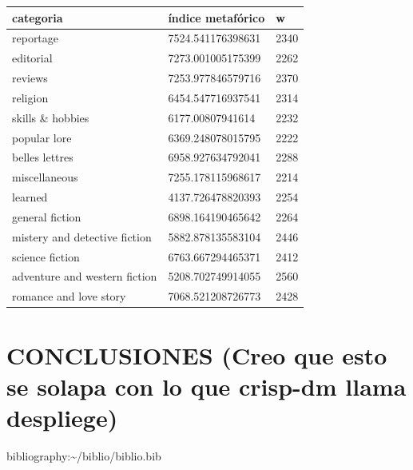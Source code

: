 \documentclass[twoside]{article}
\begin{document}
   \begin{table}[!ht]
    \centering
    \begin{tabular}{|l|l|l|}
    \hline
        categoria & índice metafórico & w \\ \hline
        reportage & 7524.541176398631 & 2340 \\ \hline
        editorial & 7273.001005175399 & 2262 \\ \hline
        reviews & 7253.977846579716 & 2370 \\ \hline
        religion & 6454.547716937541 & 2314 \\ \hline
        skills \& hobbies & 6177.00807941614 & 2232 \\ \hline
        popular lore & 6369.248078015795 & 2222 \\ \hline
        belles lettres & 6958.927634792041 & 2288 \\ \hline
        miscellaneous & 7255.178115968617 & 2214 \\ \hline
        learned & 4137.726478820393 & 2254 \\ \hline
        general fiction & 6898.164190465642 & 2264 \\ \hline
        mistery and detective fiction & 5882.878135583104 & 2446 \\ \hline
        science fiction & 6763.667294465371 & 2412 \\ \hline
        adventure and western fiction & 5208.702749914055 & 2560 \\ \hline
        romance and love story & 7068.521208726773 & 2428 \\ \hline
    \end{tabular}
\end{table}




\section{CONCLUSIONES (Creo que esto se solapa con lo que crisp-dm llama despliege)}
\label{sec:org775efe6}




 

bibliography:\textasciitilde{}/biblio/biblio.bib
\end{document}
